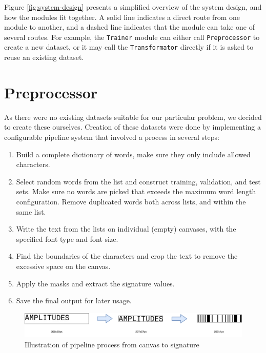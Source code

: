 Figure \ref{fig:system-design} presents a simplified overview of the system design, and how the modules fit together. A solid line indicates a direct route from one module to another, and a dashed line indicates that the module can take one of several routes. For example, the {\tt Trainer} module can either call {\tt Preprocessor} to create a new dataset, or it may call the {\tt Transformator} directly if it is asked to reuse an existing dataset.


\section{Preprocessor}
\label{sec:preprocessor}
As there were no existing datasets suitable for our particular problem, we decided to create these ourselves. Creation of these datasets were done by implementing a configurable pipeline system that involved a process in several steps:

\begin{enumerate}
    \item Build a complete dictionary of words, make sure they only include allowed characters.
    \item Select random words from the list and construct training, validation, and test sets. Make sure no words are picked that exceeds the maximum word length configuration. Remove duplicated words both across lists, and within the same list.
    \item Write the text from the lists on individual (empty) canvases, with the specified font type and font size.
    \item Find the boundaries of the characters and crop the text to remove the excessive space on the canvas.
    \item Apply the masks and extract the signature values.
    \item Save the final output for later usage.
\end{enumerate}

\begin{figure}[H]
    \centering
    \includegraphics[width=1\textwidth]{fig/development_process/pipeline.png}
    \caption{Illustration of pipeline process from canvas to signature}
    \label{fig:development-pipeline}
\end{figure}

